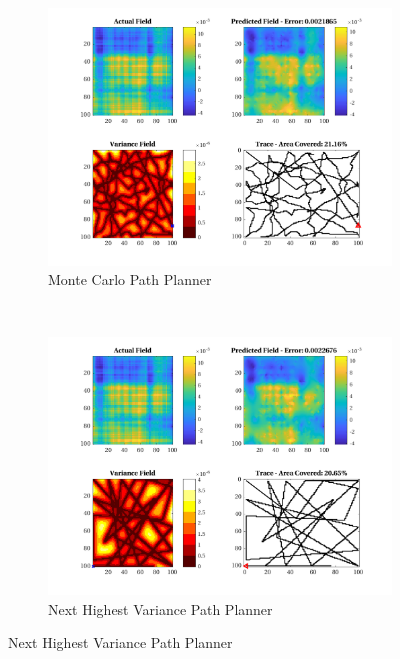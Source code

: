 \begin{figure}[htb!]
    \centering
    \begin{subfigure}[t]{0.5\textwidth}
        \centering
        \includegraphics[width=\linewidth]{figures/hbresults/mc_20p_100x100_sf_100_seed_2.png}
        \captionsetup{skip=0.10\baselineskip,size=footnotesize}
        \caption{Monte Carlo Path Planner}
    \end{subfigure}%
    ~ 
    \begin{subfigure}[t]{0.5\textwidth}
        \centering
        \includegraphics[width=\linewidth]{figures/hbresults/nhv_20p_100x100_sf_100_seed_2.png}
        \captionsetup{skip=0.10\baselineskip,size=footnotesize}
        \caption{Next Highest Variance Path Planner}

\end{subfigure}
\end{figure}
